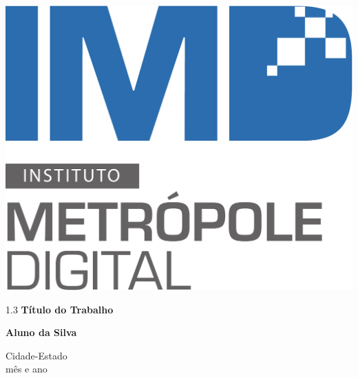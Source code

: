 \begin{titlingpage}
\begin{center}
\begin{minipage}{2.2cm}
\begin{center}
				\includegraphics[scale=0.1]{Imagens/Logotipo-IMD}
			\end{center}
		\end{minipage}
			
		\vspace{6cm}
						
		{\setlength{\baselineskip}%
		{1.3\baselineskip}
		{\LARGE \textbf{Título do Trabalho}}\par}
			
		\vspace{3cm}
			
		{\large \textbf{Aluno da Silva}}
						
		\vspace{6cm}
		
	Cidade-Estado\\mês e ano %
	\end{center}
\end{titlingpage}
